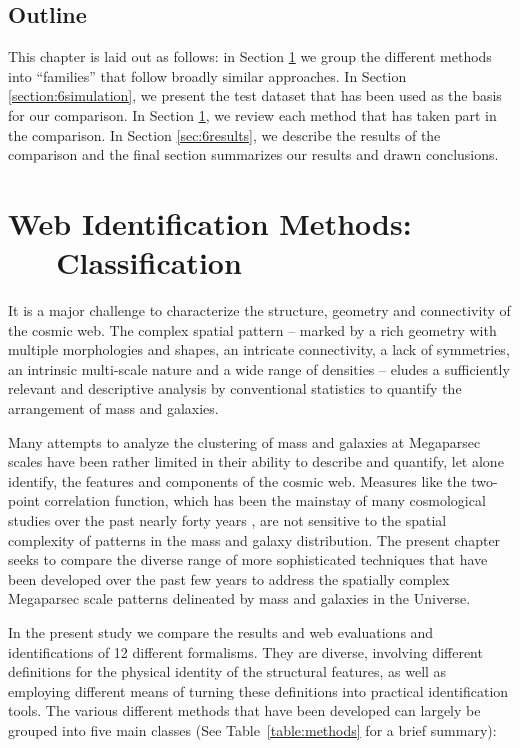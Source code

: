 \subsection{Outline}
This chapter is laid out as follows: in Section \ref{section:6methods} we group the different methods into ``families'' that follow broadly similar approaches. In Section \ref{section:6simulation}, we present the test dataset that has been used as the basis for our comparison. In Section \ref{section:6methods}, we review each method that has taken part in the comparison. In Section \ref{sec:6results}, we describe the results of the comparison and the final section summarizes our results and drawn conclusions.

\section{Web Identification Methods: \ \ \ Classification}
\label{section:6methods}

%


It is a major challenge to characterize the structure, geometry and connectivity of the cosmic web. The complex spatial pattern -- marked  
by a rich geometry with multiple morphologies and shapes, an intricate connectivity, a lack of  symmetries, an intrinsic multi-scale nature and 
a wide range of densities -- eludes a sufficiently relevant and descriptive analysis by conventional statistics to quantify the arrangement of 
mass and galaxies. 

Many attempts to analyze the clustering of mass and galaxies at Megaparsec scales have been rather limited in their ability to describe and quantify, let 
alone identify, the features and components of the cosmic web. Measures like the two-point correlation function, which has been the mainstay of many 
cosmological studies over the past nearly forty years \citep{Peebles1980}, are not sensitive to the spatial complexity of patterns in the mass and galaxy distribution.  
The present chapter seeks to compare the diverse range of more sophisticated techniques that have been developed over the past few years to address the 
spatially complex Megaparsec scale patterns delineated by mass and galaxies in the Universe. 

In the present study we compare the results and web evaluations and identifications of 12 different formalisms. 
They are diverse, involving different definitions for the physical identity of the structural features, as well 
as employing different means of turning these definitions into practical identification tools. The various 
different methods that have been developed can largely be grouped into five main classes (See Table~\ref{table:methods} for a brief summary):

